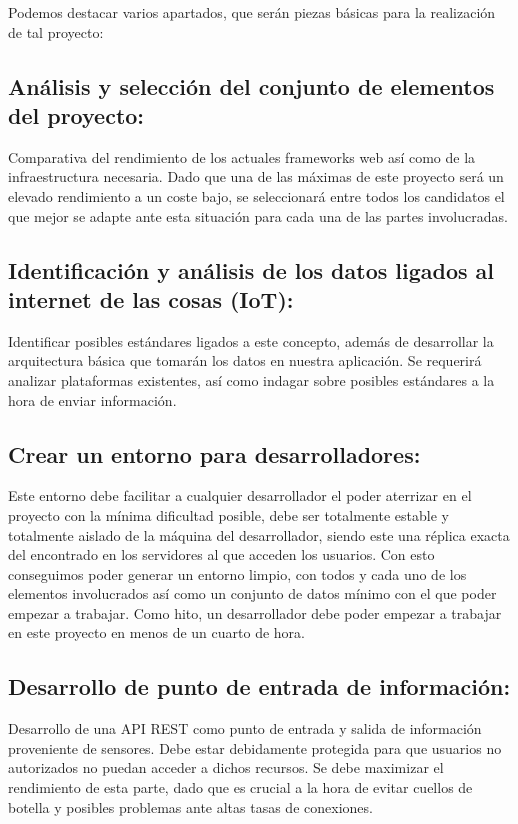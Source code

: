 Podemos destacar varios apartados, que serán piezas básicas para la realización
de tal proyecto:

\subsection{Análisis y selección del conjunto de elementos del
proyecto:} Comparativa del rendimiento de los actuales frameworks web así como de la
infraestructura necesaria. Dado que una de las máximas de
este proyecto será un elevado rendimiento a un coste bajo, se seleccionará entre
todos los candidatos el que mejor se adapte ante esta situación para cada una de
las partes involucradas.

\subsection{Identificación y análisis de los datos ligados al internet de las
  cosas (IoT):} Identificar posibles estándares ligados a este concepto, además de desarrollar la
arquitectura básica que tomarán los datos en nuestra aplicación. Se requerirá
analizar plataformas existentes, así como indagar sobre posibles estándares a la
hora de enviar información.

\subsection{Crear un entorno para desarrolladores:}
Este entorno debe facilitar a cualquier desarrollador el poder aterrizar en el
proyecto con la mínima dificultad posible, debe ser totalmente estable y
totalmente aislado de la máquina del desarrollador, siendo este una réplica exacta del encontrado en los
servidores al que acceden los usuarios. Con esto conseguimos poder generar un
entorno limpio, con todos y cada uno de los elementos involucrados así como un
conjunto de datos mínimo con el que poder empezar a trabajar. Como hito, un desarrollador
debe poder empezar a trabajar en este proyecto en menos de un cuarto de hora.

\subsection{Desarrollo de punto de entrada de información:} Desarrollo de una
\acs{API} \acs{REST} como punto de entrada y salida de información proveniente
de sensores. Debe estar debidamente protegida para que usuarios no autorizados no
puedan acceder a dichos recursos. Se debe maximizar el rendimiento de esta
parte, dado que es crucial a la hora de evitar cuellos de botella y posibles
problemas ante altas tasas de conexiones. 

